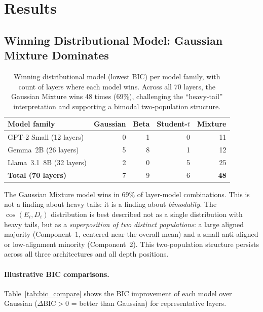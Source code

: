 \documentclass[11pt,a4paper]{article}
\newcommand{\cosED}{\cos(E_i, D_i)}
\newcommand{\DBIC}{\Delta\text{BIC}}
\begin{document}
\section{Results}
\label{sec:results}

\subsection{Winning Distributional Model: Gaussian Mixture Dominates}
\label{sec:winner}

\begin{table}[H]
\centering
\caption{Winning distributional model (lowest BIC) per model family, with count of layers where each model wins. Across all 70 layers, the Gaussian Mixture wins 48 times (69\%), challenging the ``heavy-tail'' interpretation and supporting a bimodal two-population structure.}
\label{tab:winner_counts}
\begin{tabular}{@{}lrrrr@{}}
\toprule
Model family & Gaussian & Beta & Student-$t$ & Mixture \\
\midrule
GPT-2 Small (12 layers)      & 0 & 1 & 0 & 11 \\
Gemma~2B (26 layers)         & 5 & 8 & 1 & 12 \\
Llama~3.1~8B (32 layers)     & 2 & 0 & 5 & 25 \\
\midrule
\textbf{Total (70 layers)}   & 7 & 9 & 6 & \textbf{48} \\
\bottomrule
\end{tabular}
\end{table}

\begin{revealed}
The Gaussian Mixture model wins in 69\% of layer-model combinations. This is not a finding about heavy tails: it is a finding about \emph{bimodality}. The $\cosED$ distribution is best described not as a single distribution with heavy tails, but as a \emph{superposition of two distinct populations}: a large aligned majority (Component~1, centered near the overall mean) and a small anti-aligned or low-alignment minority (Component~2). This two-population structure persists across all three architectures and all depth positions.
\end{revealed}

\paragraph{Illustrative BIC comparisons.} Table~\ref{tab:bic_compare} shows the BIC improvement of each model over Gaussian ($\DBIC > 0$ = better than Gaussian) for representative layers.
\end{document}
